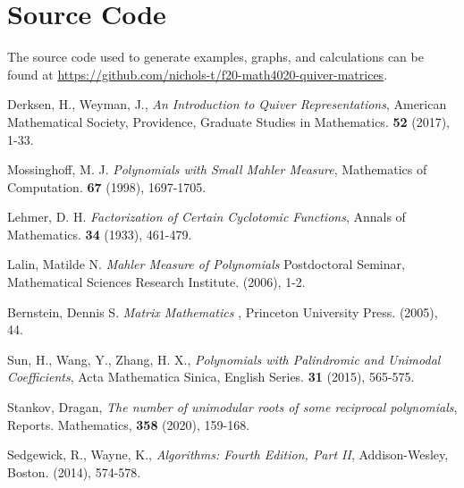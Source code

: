 \documentclass{amsart}
\theoremstyle{theorem}
\theoremstyle{theorem*}
\theoremstyle{definition}
\begin{document}
\section{Source Code}

The source code used to generate examples, graphs, and calculations can
be found at 
\textcolor{blue}{\url{https://github.com/nichols-t/f20-math4020-quiver-matrices}}.
\begin{thebibliography}{99}

     Derksen, H., Weyman, J., {\em An Introduction to Quiver
            Representations\/}, American Mathematical Society, Providence,
    Graduate Studies in Mathematics. {\bf 52} (2017), 1-33.

     Mossinghoff, M. J. {\em Polynomials with Small Mahler
            Measure\/}, Mathematics of Computation. {\bf 67} (1998), 1697-1705.

     Lehmer, D. H. {\em Factorization of Certain Cyclotomic
            Functions\/}, Annals of Mathematics. {\bf 34} (1933), 461-479.

     Lalin, Matilde N. {\em Mahler Measure of Polynomials\/}
    Postdoctoral Seminar, Mathematical Sciences Research Institute. (2006), 1-2.

     Bernstein, Dennis S. {\em Matrix Mathematics \/},
    Princeton University Press. (2005), 44.

     Sun, H., Wang, Y., Zhang, H. X., {\em Polynomials with
    Palindromic and Unimodal Coefficients}, Acta Mathematica Sinica, English
    Series. {\bf 31} (2015), 565-575.

     Stankov, Dragan, {\em The number of unimodular roots of some
    reciprocal polynomials}, Reports. Mathematics, {\bf 358} (2020), 159-168.

     Sedgewick, R., Wayne, K., {\em Algorithms: Fourth Edition,
            Part II\/}, Addison-Wesley, Boston. (2014), 574-578.
            
\end{thebibliography}
\end{document}
